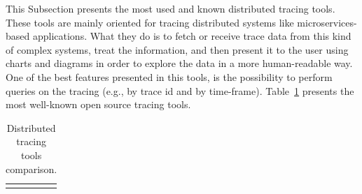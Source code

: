 This Subsection presents the most used and known distributed tracing tools. These tools are mainly oriented for tracing distributed systems like microservices-based applications. What they do is to fetch or receive trace data from this kind of complex systems, treat the information, and then present it to the user using charts and diagrams in order to explore the data in a more human-readable way. One of the best features presented in this tools, is the possibility to perform queries on the tracing (e.g., by trace id and by time-frame). Table~\ref{table:distributed_tracing_tools} presents the most well-known open source tracing tools.

\begin{table}[]
    \caption{Distributed tracing tools comparison.}
    \label{table:distributed_tracing_tools}
    \centering
    \begin{tabularx}{\linewidth} {
            >{\hsize=0.70\hsize}X|
            >{\hsize=1.15\hsize}X|
            >{\hsize=1.15\hsize}X|}
        \cline{2-3}


\end{tabularx}
\end{table}
